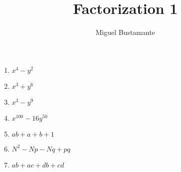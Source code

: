 \documentclass{article}
\title{Factorization 1}
\author{Miguel Bustamante}
\begin{document}
\maketitle
\begin{multicols}{3}
\begin{enumerate}
    \item $x^4-y^2$
    \item $x^3+y^6$
    \item $x^3-y^9$
    \item $x^{100}-16y^{50}$
    \item $ab+a+b+1$
    \item $N^2-Np-Nq+pq$
    \item $ab+ac+db+cd$
\end{enumerate}
\end{multicols}
\end{document}

